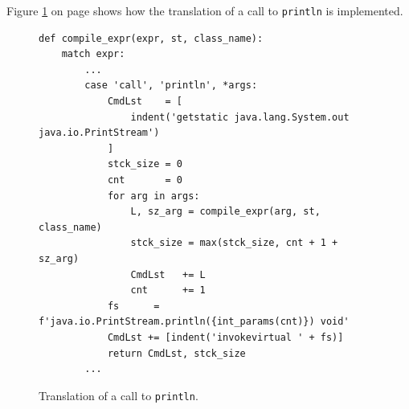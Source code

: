 \begin{enumerate}
      Figure \ref{fig:Compiler.ipynb:compile:call_println} on page \pageref{fig:Compiler.ipynb:compile:call_println}
      shows how the translation of a call to \texttt{println} is implemented.

\begin{figure}[!ht]
\centering
\begin{verbatim}
def compile_expr(expr, st, class_name):
    match expr:
        ...
        case 'call', 'println', *args:
            CmdLst    = [
                indent('getstatic java.lang.System.out java.io.PrintStream')
            ]
            stck_size = 0
            cnt       = 0
            for arg in args:
                L, sz_arg = compile_expr(arg, st, class_name)
                stck_size = max(stck_size, cnt + 1 + sz_arg)
                CmdLst   += L
                cnt      += 1
            fs      = f'java.io.PrintStream.println({int_params(cnt)}) void'
            CmdLst += [indent('invokevirtual ' + fs)]
            return CmdLst, stck_size
        ...
\end{verbatim}
\vspace*{-0.3cm}
\caption{Translation of a call to \texttt{println}.}
\label{fig:Compiler.ipynb:compile:call_println}
\end{figure}
\pagebreak


\end{enumerate}
